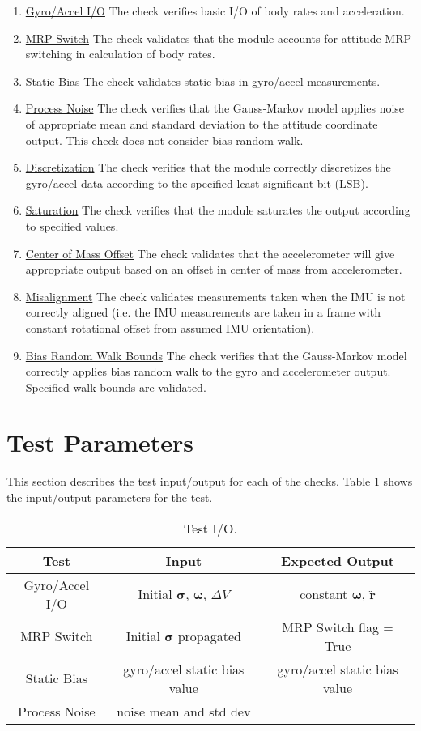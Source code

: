 \documentclass[]{BasiliskReportMemo}
\begin{document}
\begin{enumerate}
	\item \underline{Gyro/Accel I/O} The check verifies basic I/O of body rates and acceleration.
	\item \underline{MRP Switch} The check validates that the module accounts for attitude MRP switching in calculation of body rates.
	\item \underline{Static Bias} The check validates static bias in gyro/accel measurements.
	\item \underline{Process Noise} The check verifies that the Gauss-Markov model applies noise of appropriate mean and standard deviation to the attitude coordinate output. This check does not consider bias random walk.
	\item \underline{Discretization} The check verifies that the module correctly discretizes the gyro/accel data according to the specified least significant bit (LSB).
	\item \underline{Saturation} The check verifies that the module saturates the output according to specified values.
	\item \underline{Center of Mass Offset} The check validates that the accelerometer will give appropriate output based on an offset in center of mass from accelerometer.
	\item \underline{Misalignment} The check validates measurements taken when the IMU is not correctly aligned (i.e. the IMU measurements are taken in a frame with constant rotational offset from assumed IMU orientation).
	\item \underline{Bias Random Walk Bounds} The check verifies that the Gauss-Markov model correctly applies bias random walk to the gyro and accelerometer output. Specified walk bounds are validated.
\end{enumerate} 

\section{Test Parameters}

This section describes the test input/output for each of the checks. Table \ref{tab:parameters} shows the input/output parameters for the test.

\begin{table}[htbp]
	\caption{Test I/O.}
	\label{tab:parameters}
	\centering \fontsize{10}{10}\selectfont
	\begin{tabular}{ c | c | c }
		\hline
		\textbf{Test}   & \textbf{Input} & \textbf{Expected Output} \\ \hline
		Gyro/Accel I/O & Initial $\bm \sigma$, $\bm \omega$, $\Delta V$ & constant $\bm \omega$, $\ddot{\bm r}$ \\ \hline
		MRP Switch & Initial $\bm \sigma$ propagated  & MRP Switch flag = True \\ \hline
		Static Bias & gyro/accel static bias value & gyro/accel static bias value \\ \hline
		Process Noise & noise mean and std dev
	\end{tabular}
\end{table}
\end{document}
